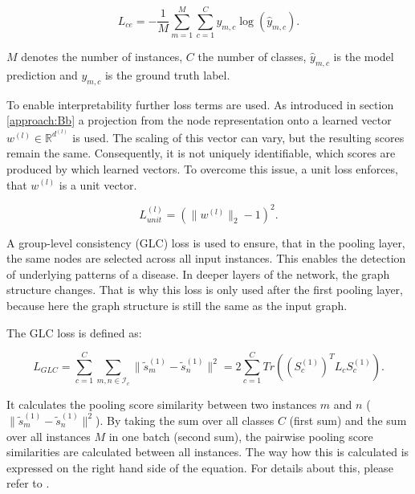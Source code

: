 \begin{equation}\label{eq:loss_ce}
	L_{ce} = -\frac{1}{M} \sum_{m=1}^{M} \sum_{c=1}^{C} y_{m,c} \log(\hat{y}_{m,c}).
\end{equation}

$M$ denotes the number of instances, $C$ the number of classes, $\hat{y}_{m, c}$ is the model prediction and $y_{m, c}$ is the ground truth label.

To enable interpretability further loss terms are used.
As introduced in section \ref{approach:Bb} a projection from the node representation onto a learned vector $w^{(l)} \in {\mathbb{R}}^{d^{(l)}}$ is used.
The scaling of this vector can vary, but the resulting scores remain the same. 
Consequently, it is not uniquely identifiable, which scores are produced by which learned vectors.
To overcome this issue, a unit loss enforces, that $w^{(l)}$ is a unit vector.

\begin{equation}\label{eq:loss_unit}
L_{unit}^{(l)} = (\| w^{(l)} \|_2 - 1)^2.
\end{equation}

A group-level consistency (GLC) loss is used to ensure, that in the pooling layer, the same nodes are selected across all input instances. This enables the detection of underlying patterns of a disease.
In deeper layers of the network, the graph structure changes. That is why this loss is only used after the first pooling layer, because here the graph structure is still the same as the input graph.

The GLC loss is defined as:

\begin{equation}\label{eq:loss_glc}
L_{GLC} = \sum_{c=1}^{C} \sum_{m,n \in \mathcal{I}_c}^{} \| \tilde{s}_m^{(1)} - \tilde{s}_n^{(1)} \|^2 = 2 \sum_{c=1}^{C} Tr((S_c^{(1)})^T L_c S_c^{(1)}).
\end{equation}

It calculates the pooling score similarity between two instances $m$ and $n$ ($\| \tilde{s}_m^{(1)} - \tilde{s}_n^{(1)} \|^2$). By taking the sum over all classes $C$ (first sum) and the sum over all instances $M$ in one batch (second sum), the pairwise pooling score similarities are calculated between all instances.
The way how this is calculated is expressed on the right hand side of the equation. For details about this, please refer to \cite{LI2021102233}.

